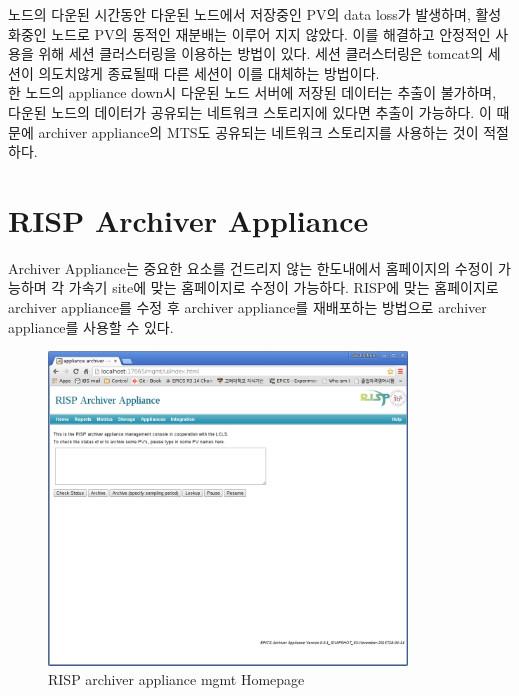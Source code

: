 \documentclass[11pt
  , a4paper
  , article
  , oneside
]{memoir}
\begin{document}
노드의 다운된 시간동안 다운된 노드에서 저장중인 PV의 data loss가 발생하며, 활성화중인 노드로 PV의 동적인 재분배는 이루어 지지 않았다. 이를 해결하고 안정적인 사용을 위해 세션 클러스터링을 이용하는 방법이 있다. 세션 클러스터링은 tomcat의 세션이 의도치않게 종료될때 다른 세션이 이를 대체하는 방법이다.\\
한 노드의 appliance down시 다운된 노드 서버에 저장된 데이터는 추출이 불가하며, 다운된 노드의 데이터가 공유되는 네트워크 스토리지에 있다면 추출이 가능하다. 이 때문에 archiver appliance의 MTS도 공유되는 네트워크 스토리지를 사용하는 것이 적절하다.
\clearpage
\section{RISP Archiver Appliance}
Archiver Appliance는 중요한 요소를 건드리지 않는 한도내에서 홈페이지의 수정이 가능하며 각 가속기 site에 맞는 홈페이지로 수정이 가능하다. RISP에 맞는 홈페이지로 archiver appliance를 수정 후 archiver appliance를 재배포하는 방법으로 archiver appliance를 사용할 수 있다.\\
\begin{figure}[h!]
	\centering
	\includegraphics[width=0.85\textwidth, height=0.5\textheight]{./images/741.png}
	\caption{RISP archiver appliance mgmt Homepage}
\end{figure}
\clearpage
\end{document}
